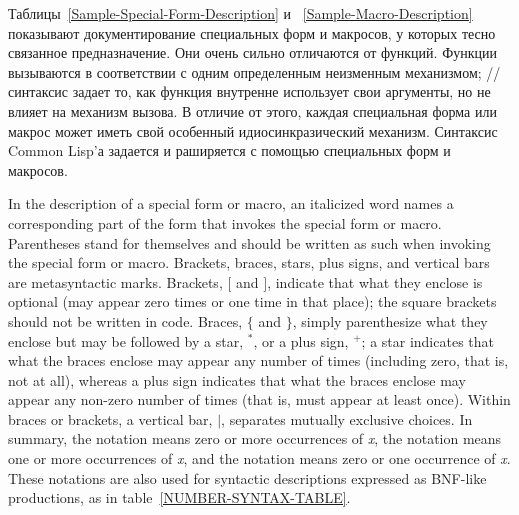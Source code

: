 Таблицы~\ref{Sample-Special-Form-Description} и ~\ref{Sample-Macro-Description}
показывают документирование специальных форм и макросов, у которых тесно
связанное предназначение.
Они очень сильно отличаются от функций.
Функции вызываются в соответствии с одним определенным неизменным механизмом;
// синтаксис задает то, как функция
внутренне использует свои аргументы, но не влияет на механизм вызова.
В отличие от этого, каждая специальная форма или макрос может иметь свой
особенный идиосинкразический механизм. Синтаксис Common Lisp'а задается и
раширяется с помощью специальных форм и макросов.

In the description of a special form or macro, an italicized word names a
corresponding part of the form that invokes the special form or macro.
Parentheses stand for themselves and should be
written as such when invoking the special form or macro.
Brackets, braces, stars, plus signs, and vertical bars are metasyntactic
marks. 
Brackets,
$\lbrack$ and $\rbrack$, indicate that what they enclose is optional
(may appear zero times or one time in that place); the square
brackets should not be written in code.
Braces, $\lbrace$ and $\rbrace$, simply parenthesize what they enclose
but may be followed by a star, ${}^*$, or a plus sign, ${}^+$;
a star indicates that what the braces enclose may appear any number of times
(including zero, that is, not at all), whereas a plus sign indicates
that what the braces enclose may appear any non-zero number of times
(that is, must appear at least once).  Within braces or brackets,
a vertical bar, $|$, separates mutually exclusive choices.
In summary, the notation  means zero or more occurrences
of {\it x}, the notation  means one or more occurrences
of {\it x}, and the notation  means zero or one occurrence
of {\it x}.  These notations are also used for syntactic
descriptions expressed as BNF-like productions, as
in table~\ref{NUMBER-SYNTAX-TABLE}.

